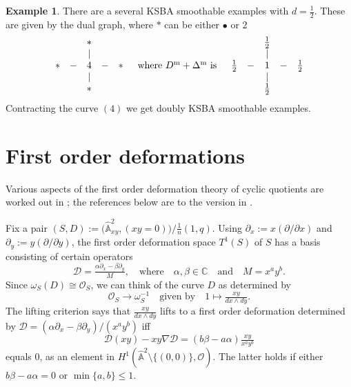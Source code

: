 \documentclass{amsart}
\theoremstyle{definition}
\newtheorem{exmp}[thm]{Example}
\theoremstyle{remark}
\renewcommand{\c}[0]{{\mathbb C}}
\renewcommand{\o}[0]{{\mathcal O}}
\renewcommand{\a}[0]{\hat{\mathbb A}}
\newcommand{\qtq}[1]{\quad\mbox{#1}\quad}
\newcommand{\dx}[0]{\partial_x}
\newcommand{\dy}[0]{\partial_y}
\begin{document}
\begin{exmp} \label{1/2.2.exmp} There are a several   KSBA smoothable
  examples with $d=\frac12$. These are given by the dual graph, where $\ast$ can be either $\bullet$ or $2$
    $$
  \begin{array}{ccccc}
    && \ast &&\\
&& | &&\\
    \ast & - & 4  & - &   \ast\\
    && | &&\\
     && \ast &&
  \end{array}
  \qtq{where $D^{\rm m}+\Delta^{\rm m}$ is}
  \begin{array}{ccccc}
    && \tfrac12 &&\\
&& | &&\\
     \tfrac12 & - & 1  & - &    \tfrac12\\
    && | &&\\
     &&  \tfrac12 &&
  \end{array}
  $$
  Contracting the curve $(4)$ we get 
   doubly KSBA smoothable examples.
\end{exmp}






\section{First order deformations}\label{first.ord.sec}


Various aspects of the first order deformation theory of cyclic quotients are worked out in \cite{k-alt}; the references below are to the version in
\cite[Sec.6.6]{k-modbook}.


Fix a pair  $(S, D):=\bigl(\a^2_{xy}, (xy=0)\bigr)/\tfrac1{n}(1,q)$.
Using  $\dx:=x(\partial/\partial x)$ and  $\dy:=y(\partial/\partial y)$,
the first order deformation space  $T^1(S)$ of $S$ has a basis consisting of certain operators
$$
{\mathcal D}=\tfrac{\alpha\dx-\beta\dy}{M},\qtq{where} \alpha,\beta\in \c\qtq{and}
M=x^ay^b.
$$
Since  $\omega_S(D)\cong \o_S$, we can think of the curve $D$ as determined by
$$
\o_S\to \omega_S^{-1}\qtq{given by}  1\mapsto \tfrac{xy}{dx\wedge dy}.
$$
The lifting criterion \cite[6.58]{k-modbook} says that
$\frac{xy}{dx\wedge dy} $ lifts to a first order deformation determined by
 ${\mathcal D}=({\alpha\dx-\beta\dy})/(x^ay^b)$ iff
$$
{\mathcal D}(xy)-xy\nabla {\mathcal D}= (b\beta-a\alpha) \tfrac{xy}{x^ay^b}
$$
equals $0$, as an element in $H^1(\a^2\setminus\{(0,0)\}, \o)$.
The latter holds if either $b\beta-a\alpha=0$ or $\min\{a,b\}\leq 1$.
\end{document}
